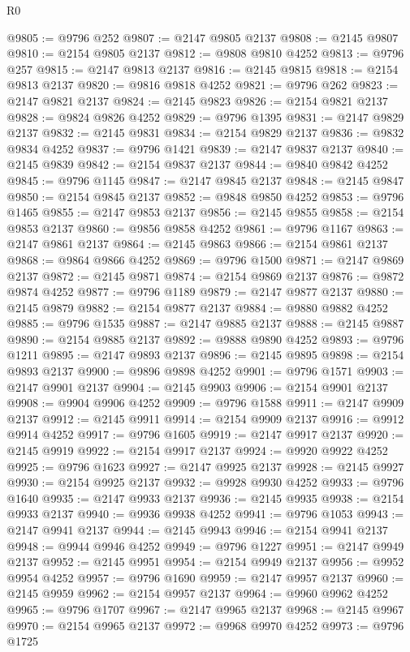 \begin{lexlean}{R0}
\begin{coremodule}
@9805 := @9796 @252
@9807 := @2147 @9805 @2137
@9808 := @2145 @9807
@9810 := @2154 @9805 @2137
@9812 := @9808 @9810 @4252
@9813 := @9796 @257
@9815 := @2147 @9813 @2137
@9816 := @2145 @9815
@9818 := @2154 @9813 @2137
@9820 := @9816 @9818 @4252
@9821 := @9796 @262
@9823 := @2147 @9821 @2137
@9824 := @2145 @9823
@9826 := @2154 @9821 @2137
@9828 := @9824 @9826 @4252
@9829 := @9796 @1395
@9831 := @2147 @9829 @2137
@9832 := @2145 @9831
@9834 := @2154 @9829 @2137
@9836 := @9832 @9834 @4252
@9837 := @9796 @1421
@9839 := @2147 @9837 @2137
@9840 := @2145 @9839
@9842 := @2154 @9837 @2137
@9844 := @9840 @9842 @4252
@9845 := @9796 @1145
@9847 := @2147 @9845 @2137
@9848 := @2145 @9847
@9850 := @2154 @9845 @2137
@9852 := @9848 @9850 @4252
@9853 := @9796 @1465
@9855 := @2147 @9853 @2137
@9856 := @2145 @9855
@9858 := @2154 @9853 @2137
@9860 := @9856 @9858 @4252
@9861 := @9796 @1167
@9863 := @2147 @9861 @2137
@9864 := @2145 @9863
@9866 := @2154 @9861 @2137
@9868 := @9864 @9866 @4252
@9869 := @9796 @1500
@9871 := @2147 @9869 @2137
@9872 := @2145 @9871
@9874 := @2154 @9869 @2137
@9876 := @9872 @9874 @4252
@9877 := @9796 @1189
@9879 := @2147 @9877 @2137
@9880 := @2145 @9879
@9882 := @2154 @9877 @2137
@9884 := @9880 @9882 @4252
@9885 := @9796 @1535
@9887 := @2147 @9885 @2137
@9888 := @2145 @9887
@9890 := @2154 @9885 @2137
@9892 := @9888 @9890 @4252
@9893 := @9796 @1211
@9895 := @2147 @9893 @2137
@9896 := @2145 @9895
@9898 := @2154 @9893 @2137
@9900 := @9896 @9898 @4252
@9901 := @9796 @1571
@9903 := @2147 @9901 @2137
@9904 := @2145 @9903
@9906 := @2154 @9901 @2137
@9908 := @9904 @9906 @4252
@9909 := @9796 @1588
@9911 := @2147 @9909 @2137
@9912 := @2145 @9911
@9914 := @2154 @9909 @2137
@9916 := @9912 @9914 @4252
@9917 := @9796 @1605
@9919 := @2147 @9917 @2137
@9920 := @2145 @9919
@9922 := @2154 @9917 @2137
@9924 := @9920 @9922 @4252
@9925 := @9796 @1623
@9927 := @2147 @9925 @2137
@9928 := @2145 @9927
@9930 := @2154 @9925 @2137
@9932 := @9928 @9930 @4252
@9933 := @9796 @1640
@9935 := @2147 @9933 @2137
@9936 := @2145 @9935
@9938 := @2154 @9933 @2137
@9940 := @9936 @9938 @4252
@9941 := @9796 @1053
@9943 := @2147 @9941 @2137
@9944 := @2145 @9943
@9946 := @2154 @9941 @2137
@9948 := @9944 @9946 @4252
@9949 := @9796 @1227
@9951 := @2147 @9949 @2137
@9952 := @2145 @9951
@9954 := @2154 @9949 @2137
@9956 := @9952 @9954 @4252
@9957 := @9796 @1690
@9959 := @2147 @9957 @2137
@9960 := @2145 @9959
@9962 := @2154 @9957 @2137
@9964 := @9960 @9962 @4252
@9965 := @9796 @1707
@9967 := @2147 @9965 @2137
@9968 := @2145 @9967
@9970 := @2154 @9965 @2137
@9972 := @9968 @9970 @4252
@9973 := @9796 @1725

\end{coremodule}
\end{lexlean}
